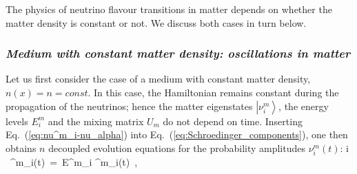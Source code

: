 The physics of neutrino flavour transitions in matter depends on whether the matter density
is constant or not. We discuss both cases in turn below.




\subsubsection{\it Medium with constant matter density: oscillations in matter  %
\label{subsec:constant}}                                                                                     %

Let us first consider the case of a medium with constant matter density, $n(x) = n = const$.
In this case, the Hamiltonian remains constant during the propagation of the neutrinos;
hence the matter eigenstates $\left|\nu^m_i \right>$, the energy levels $E^m_i$ and the mixing
matrix $U_m$ do not depend on time.
Inserting Eq.~(\ref{eq:nu^m_i-nu_alpha}) into Eq.~(\ref{eq:Schroedinger_components}), one
then obtains $n$ decoupled evolution equations for the probability amplitudes $\nu^m_i(t)$:
%
\be
   i \, \nu^m_i(t)\, =\, E^m_i \nu^m_i(t)\, ,
\eeq
%
